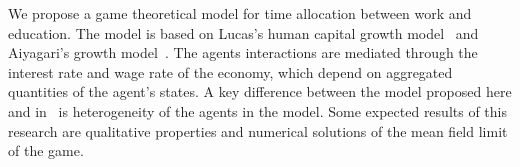 We propose a game theoretical model for time allocation between work and education.
The model is based on Lucas's human capital growth model~\cite{lucas1988mechanics} and Aiyagari’s growth model~\cite{achdou2022income,carmona2018probabilistic}.
The agents interactions are mediated through the interest rate and wage rate of the economy, which depend on aggregated quantities of the agent's states.
A key difference between the model proposed here and in~\cite{lucas1988mechanics} is heterogeneity of the agents in the model.
Some expected results of this research are qualitative properties and numerical solutions of the mean field limit of the game.


